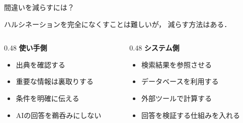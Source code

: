\documentclass[aspectratio=169,professionalfonts]{beamer}
\begin{document}
\begin{frame}{間違いを減らすには？}

  ハルシネーションを完全になくすことは難しいが，
  減らす方法はある．

  \vspace{1em}

  \begin{columns}

    \begin{column}{0.48\textwidth}
      \textbf{使い手側}

      \begin{itemize}
        \item 出典を確認する
        \item 重要な情報は裏取りする
        \item 条件を明確に伝える
        \item AIの回答を鵜呑みにしない
      \end{itemize}
    \end{column}

    \begin{column}{0.48\textwidth}
      \textbf{システム側}

      \begin{itemize}
        \item 検索結果を参照させる
        \item データベースを利用する
        \item 外部ツールで計算する
        \item 回答を検証する仕組みを入れる
      \end{itemize}
    \end{column}

  \end{columns}


\end{frame}
\end{document}
